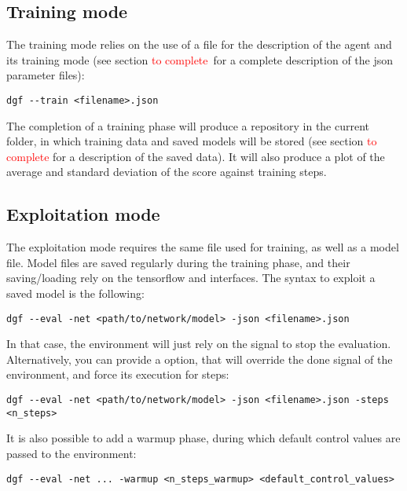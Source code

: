 \subsection{Training mode}

The training mode relies on the use of a  file for the description of the agent and its training mode (see section \textcolor{red}{to complete} for a complete description of the json parameter files):

\begin{verbatim}
dgf --train <filename>.json
\end{verbatim}

The completion of a training phase will produce a  repository in the current folder, in which training data and saved models will be stored (see section \textcolor{red}{to complete} for a description of the saved data). It will also produce a plot of the average and standard deviation of the score against training steps. 

\subsection{Exploitation mode}

The exploitation mode requires the same  file used for training, as well as a model file. Model files are saved regularly during the training phase, and their saving/loading rely on the tensorflow  and  interfaces. The syntax to exploit a saved model is the following:

\begin{verbatim}
dgf --eval -net <path/to/network/model> -json <filename>.json 
\end{verbatim}

In that case, the environment will just rely on the  signal to stop the evaluation. Alternatively, you can provide a  option, that will override the done signal of the environment, and force its execution for  steps:

\begin{verbatim}
dgf --eval -net <path/to/network/model> -json <filename>.json -steps <n_steps>
\end{verbatim}

It is also possible to add a warmup phase, during which default control values are passed to the environment:

\begin{verbatim}
dgf --eval -net ... -warmup <n_steps_warmup> <default_control_values>
\end{verbatim}